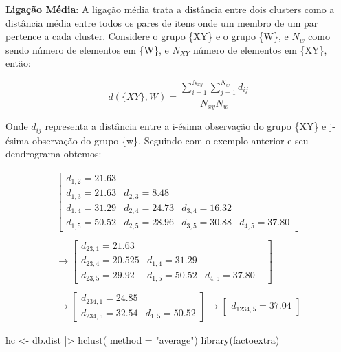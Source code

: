 \documentclass[
  letterpaper,
  DIV=11,
  numbers=noendperiod]{scrreprt}
\newenvironment{Shaded}{\begin{snugshade}}{\end{snugshade}}
\newcommand{\AttributeTok}[1]{\textcolor[rgb]{0.40,0.45,0.13}{#1}}
\newcommand{\FunctionTok}[1]{\textcolor[rgb]{0.28,0.35,0.67}{#1}}
\newcommand{\NormalTok}[1]{\textcolor[rgb]{0.00,0.23,0.31}{#1}}
\newcommand{\OtherTok}[1]{\textcolor[rgb]{0.00,0.23,0.31}{#1}}
\newcommand{\SpecialCharTok}[1]{\textcolor[rgb]{0.37,0.37,0.37}{#1}}
\newcommand{\StringTok}[1]{\textcolor[rgb]{0.13,0.47,0.30}{#1}}
\begin{document}
\textbf{Ligação Média}: A ligação média trata a distância entre dois
clusters como a distância média entre todos os pares de itens onde um
membro de um par pertence a cada cluster. Considere o grupo \{XY\} e o
grupo \{W\}, e \(N_w\) como sendo número de elementos em \{W\}, e
\(N_{XY}\) número de elementos em \{XY\}, então:

\[
d(\{XY\},W) = \frac{\sum^{N_{xy}}_{i=1}\sum_{j=1}^{N_w}d_{ij}}{N_{xy}N_w}
\]

Onde \(d_{ij}\) representa a distância entre a i-ésima observação do
grupo \{XY\} e j-ésima observação do grupo \{w\}. Seguindo com o exemplo
anterior e seu dendrograma obtemos:

\[
\begin{split}
\begin{bmatrix}
d_{1,2}=21.63 &  & & \\
d_{1,3}= 21.63 & d_{2,3}=8.48 & & \\
d_{1,4}=31.29 & d_{2,4}=24.73 & d_{3,4}=16.32 \\
d_{1,5}=50.52 & d_{2,5}=28.96 & d_{3,5}=30.88 & d_{4,5}=37.80
\end{bmatrix}\\
\\\rightarrow
\begin{bmatrix}
d_{23,1}=21.63 &  & & \\
d_{23,4}= 20.525 & d_{1,4}=31.29 & & \\
d_{23,5}=29.92 & d_{1,5}=50.52 & d_{4,5}=37.80 
\end{bmatrix}
\\
\\ \rightarrow
\begin{bmatrix}
d_{234,1}=24.85 \\
d_{234,5}= 32.54 & d_{1,5} = 50.52
\end{bmatrix} \rightarrow
\begin{bmatrix}
d_{1234,5}=37.04
\end{bmatrix}
\end{split}
\]

\begin{Shaded}
\begin{Highlighting}[]
\NormalTok{hc }\OtherTok{\textless{}{-}}\NormalTok{  db.dist }\SpecialCharTok{|\textgreater{}} 
  \FunctionTok{hclust}\NormalTok{( }\AttributeTok{method =} \StringTok{"average"}\NormalTok{) }
\FunctionTok{library}\NormalTok{(factoextra)}
\end{Highlighting}
\end{Shaded}
\end{document}
